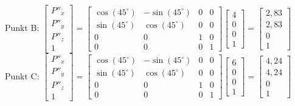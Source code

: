 \documentclass[11pt, a4paper]{article} %
\begin{document}
Punkt B: $\begin{bmatrix}
	P''_x \\ P''_y \\ P''_z \\ 1
\end{bmatrix} = \begin{bmatrix}
	\cos(45^\circ) & -\sin(45^\circ) & 0 & 0 \\ \sin(45^\circ) & \cos(45^\circ) & 0 & 0 \\ 0 & 0 & 1 & 0 \\ 0 & 0 & 0 & 1
\end{bmatrix} \begin{bmatrix}
	4 \\ 0 \\ 0 \\ 1
\end{bmatrix} = \begin{bmatrix}
2,83 \\ 2,83 \\ 0 \\ 1
\end{bmatrix}$ \\
Punkt C: $\begin{bmatrix}
	P''_x \\ P''_y \\ P''_z \\ 1
\end{bmatrix} = \begin{bmatrix}
	\cos(45^\circ) & -\sin(45^\circ) & 0 & 0 \\ \sin(45^\circ) & \cos(45^\circ) & 0 & 0 \\ 0 & 0 & 1 & 0 \\ 0 & 0 & 0 & 1
\end{bmatrix} \begin{bmatrix}
	6 \\ 0 \\ 0 \\ 1
\end{bmatrix} = \begin{bmatrix}
4,24 \\ 4,24 \\ 0 \\ 1
\end{bmatrix}$ \\[0.5cm]
\begin{figure}[h]
\end{figure}
\end{document}
